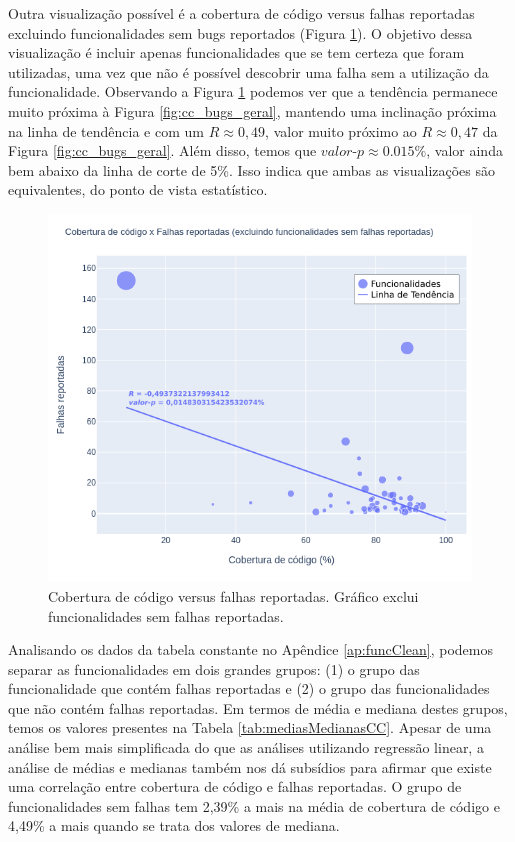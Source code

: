 \documentclass[11.5pt]{article}
\begin{document}
Outra visualização possível é a cobertura de código versus falhas reportadas excluindo
funcionalidades sem bugs reportados (Figura \ref{fig:cc_bugs_com_bugs}).
O objetivo dessa visualização é incluir apenas funcionalidades que se tem certeza que foram
utilizadas, uma vez que não é possível descobrir uma falha sem a utilização da funcionalidade.
Observando a Figura \ref{fig:cc_bugs_com_bugs} podemos ver que a tendência permanece muito próxima
à Figura \ref{fig:cc_bugs_geral}, mantendo uma inclinação próxima na linha de tendência e com um
$R \approx 0,49$, valor muito próximo ao $R \approx 0,47$ da Figura \ref{fig:cc_bugs_geral}.
Além disso, temos que $valor\mbox{-}p \approx 0.015\%$, valor ainda bem abaixo da linha de corte de
5\%.
Isso indica que ambas as visualizações são equivalentes, do ponto de vista estatístico.
\begin{figure}[ht]
    \centering
    \includegraphics[width=1.0\textwidth]{cc_bugs_com_bugs.png}
    \caption{Cobertura de código versus falhas reportadas. Gráfico exclui funcionalidades sem
falhas reportadas.}
    \label{fig:cc_bugs_com_bugs}
\end{figure}

Analisando os dados da tabela constante no Apêndice \ref{ap:funcClean}, podemos separar as
funcionalidades em dois grandes grupos:
(1) o grupo das funcionalidade que contém falhas reportadas e
(2) o grupo das funcionalidades que não contém falhas reportadas.
Em termos de média e mediana destes grupos, temos os valores presentes na Tabela
\ref{tab:mediasMedianasCC}.
Apesar de uma análise bem mais simplificada do que as análises utilizando regressão linear, a
análise de médias e medianas também nos dá subsídios para afirmar que existe uma correlação entre
cobertura de código e falhas reportadas.
O grupo de funcionalidades sem falhas tem 2,39\% a mais na média de cobertura de código e 4,49\% a
mais quando se trata dos valores de mediana.
\end{document}
